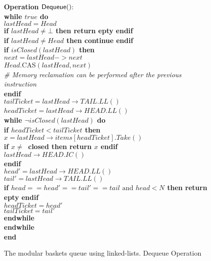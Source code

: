 \begin{figure}[H]
{{\begin{minipage}[t]{180mm}
\begin{tabbing}
{\bf Operation} ${\sf Dequeue}()$: \\
 \> {\bf while \(true\) do}\\
 \>\> \(lastHead = Head\) \\
 \>\> {\bf if \(lastHead \ne \bot\) then return epty endif}\\
 \>\> {\bf if \(lastHead \ne Head\) then continue endif}\\
 \>\> {\bf if \(isClosed(lastHead)\) then}\\
 \>\>\> {\bf \(next = lastHead->next\)} \\
 \>\>\> {\(Head.\)CAS\((lastHead, next)\)} \\
\>\>\> {\textit{\# Memory reclamation can be performed after the previous instruction}}\\
 \> \> {\bf endif} \\
 \>\> \(tailTicket = lastHead\rightarrow{}TAIL.LL()\) \\
 \>\> \(headTicket = lastHead\rightarrow{}HEAD.LL()\)\ \\
 \>\> {\bf while \(\neg isClosed(lastHead)\) do} \\
 \>\>\> {\bf if \(headTicket < tailTicket\) then} \\
 \>\>\>\> \(x = lastHead\rightarrow{}items[headTicket].Take()\) \\
 \>\>\>\> {\bf if \(x \ne \)\ closed then return \(x\) endif} \\
 \>\>\>\> \(lastHead\rightarrow{}HEAD.IC()\) \\
 \>\>\> {\bf endif} \\
 \>\>\> {$head' = lastHead\rightarrow{}HEAD.LL()$}\\
 \>\>\> {$tail' = lastHead\rightarrow{}TAIL.LL()$}\\
 \>\>\> {\bf if $head == head' == tail' == tail \text{ and } head < N$ then return epty endif}\\
 \>\>\> $headTicket = head'$ \\
 \>\>\> $tailTicket = tail'$\\
 \>\> {\bf endwhile} \\
 \> {\bf endwhile}\\
{\bf end \Deq}
\end{tabbing}
\end{minipage} }
\caption{\label{alg:basket-queue-linked-list-deq}The modular baskets queue using linked-lists. Dequeue Operation}
}
\end{figure}



